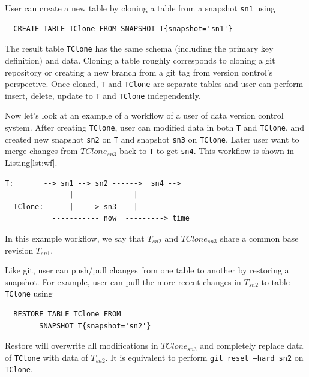 \documentclass[sigconf,nonacm]{acmart} %
\begin{document}
User can create a new table by cloning a table from a snapshot \texttt{sn1} using 
\begin{verbatim}
  CREATE TABLE TClone FROM SNAPSHOT T{snapshot='sn1'}
\end{verbatim}
The result table \texttt{TClone} has the same schema (including 
the primary key definition) and data.  Cloning a table roughly 
corresponds to cloning a git repository or creating a new branch 
from a git tag from version control's perspective.  
Once cloned, \texttt{T} and \texttt{TClone} are 
separate tables and user can perform insert, delete, update 
to \texttt{T} and \texttt{TClone} 
independently.  

Now let's look at an example of a workflow of a user of data version 
control system.   After creating \texttt{TClone}, user can modified 
data in both \texttt{T} and \texttt{TClone}, and created new 
snapshot \texttt{sn2} on \texttt{T} and snapshot \texttt{sn3} 
on \texttt{TClone}.  Later user want to merge changes 
from $TClone_{sn3}$ back to \texttt{T} to get 
\texttt{sn4}.  This workflow is shown in Listing\ref{lst:wf}.
\begin{lstlisting}[label=lst:wf,caption=Branching and Merging Workflow]
  T:       --> sn1 --> sn2 ------>  sn4 --> 
               |              |
  TClone:      |-----> sn3 ---|
           ----------- now  ---------> time
\end{lstlisting}
In this example workflow, we say that $T_{sn2}$ and $TClone_{sn3}$ 
share a common base revision $T_{sn1}$. 

Like git, user can push/pull changes from one table to another by 
restoring a snapshot.  For example, user can pull the more recent 
changes in $T_{sn2}$ to table \texttt{TClone} using 
\begin{verbatim}
  RESTORE TABLE TClone FROM
        SNAPSHOT T{snapshot='sn2'}
\end{verbatim}
Restore will overwrite all modifications in $TClone_{sn3}$ and completely replace 
data of \texttt{TClone} with data of $T_{sn2}$.  It is equivalent to perform 
\texttt{git reset --hard sn2} on \texttt{TClone}.
\end{document}
